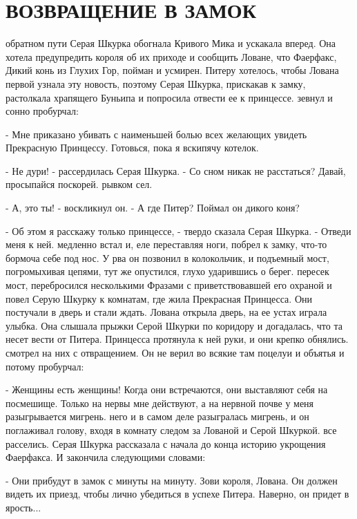 \chapter{ВОЗВРАЩЕНИЕ В ЗАМОК}
\par{} обратном пути Серая Шкурка обогнала Кривого Мика и ускакала 
вперед. Она хотела предупредить короля об их приходе и сообщить 
Ловане, что Фаерфакс, Дикий конь из Глухих Гор, пойман и усмирен. 
Питеру хотелось, чтобы Лована первой узнала эту новость, поэтому Серая 
Шкурка, прискакав к замку, растолкала храпящего Буньипа и попросила 
отвести ее к принцессе.
 зевнул и сонно пробурчал:
\par- Мне приказано убивать с наименьшей болью всех желающих увидеть 
Прекрасную Принцессу. Готовься, пока я вскипячу котелок.
\par- Не дури! - рассердилась Серая Шкурка. - Со сном никак не 
расстаться? Давай, просыпайся поскорей.
 рывком сел.
\par- А, это ты! - воскликнул он. - А где Питер? Поймал он дикого 
коня?
\par- Об этом я расскажу только принцессе, - твердо сказала Серая 
Шкурка. - Отведи меня к ней.
 медленно встал и, еле переставляя ноги, побрел к замку, 
что-то бормоча себе под нос. У рва он позвонил в колокольчик, и 
подъемный мост, погромыхивая цепями, тут же опустился, глухо 
ударившись о берег.
 пересек мост, перебросился несколькими Фразами с 
приветствовавшей его охраной и повел Серую Шкурку к комнатам, где жила 
Прекрасная Принцесса. Они постучали в дверь и стали ждать.
 Лована открыла дверь, на ее устах играла улыбка. Она слышала 
прыжки Серой Шкурки по коридору и догадалась, что та несет вести от 
Питера. Принцесса протянула к ней руки, и они крепко обнялись.
 смотрел на них с отвращением. Он не верил во всякие там 
поцелуи и объятья и потому пробурчал:
\par- Женщины есть женщины! Когда они встречаются, они выставляют себя 
на посмешище. Только на нервы мне действуют, а на нервной почве у меня 
разыгрывается мигрень.
 него и в самом деле разыгралась мигрень, и он поглаживал голову, 
входя в комнату следом за Лованой и Серой Шкуркой.
 все расселись. Серая Шкурка рассказала с начала до конца 
историю укрощения Фаерфакса. И закончила следующими словами:
\par- Они прибудут в замок с минуты на минуту. Зови короля, Лована. Он 
должен видеть их приезд, чтобы лично убедиться в успехе Питера. 
Наверно, он придет в ярость...
